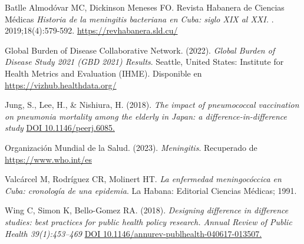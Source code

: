 \documentclass[a4paper,10pt,twocolumn]{article}
\begin{document}
\begin{thebibliography}{99}

	
	
	Batlle Almodóvar MC, Dickinson Meneses FO. Revista Habanera de Ciencias Médicas \textit{Historia de la meningitis bacteriana en Cuba: siglo XIX al XXI. }. 2019;18(4):579-592.  \href{https://revhabanera.sld.cu/index.php/rhab/article/view/2972/2387.}{https://revhabanera.sld.cu/}
	
	Global Burden of Disease Collaborative Network. (2022). \textit{Global Burden of Disease Study 2021 (GBD 2021) Results}. Seattle, United States: Institute for Health Metrics and Evaluation (IHME). Disponible en \href{https://vizhub.healthdata.org/gbd-results/}{https://vizhub.healthdata.org/}
	
	Jung, S., Lee, H., \& Nishiura, H. (2018). \textit{The impact of pneumococcal vaccination on pneumonia mortality among the elderly in Japan: a difference-in-difference study}
	\href{https://doi.org/10.7717/peerj.6085}{DOI 10.1146/peerj.6085.}
	
	
	Organización Mundial de la Salud. (2023). \textit{Meningitis}. Recuperado de 	\href{https://www.who.int/es/news-room/fact-sheets/detail/meningitis}{https://www.who.int/es}
	
	Valcárcel M, Rodríguez CR, Molinert HT. \textit{La enfermedad meningocóccica en Cuba: cronología de una epidemia}. La Habana: Editorial Ciencias Médicas; 1991.
	
	 Wing C, Simon K, Bello-Gomez RA. (2018). \textit{Designing difference in difference studies: best practices for public health policy research. Annual Review of Public Health 39(1):453–469  } 
	\href{http://dx.doi.org/10.1146/annurev-publhealth-040617-013507}{DOI 10.1146/annurev-publhealth-040617-013507.}
	
	
	
	
%
%

\end{thebibliography}


\label{end}
\end{document}
